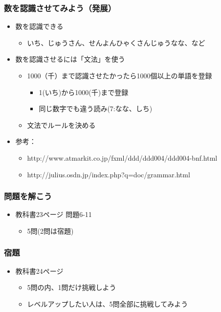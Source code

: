 \documentclass[14pt]{beamer}
\begin{document}
\begin{frame}
  \frametitle{数を認識させてみよう（発展）}
  \begin{itemize}
    \item 数を認識できる
    \begin{itemize}
      \item いち、じゅうさん、せんよんひゃくさんじゅうなな、など
    \end{itemize}
    \item 数を認識させるには「文法」を使う
    \begin{itemize}
      \item 1000（千）まで認識させたかったら1000個以上の単語を登録
      \begin{itemize}
        \item 1(いち)から1000(千)まで登録
        \item 同じ数字でも違う読み(7:なな、しち)
      \end{itemize}
      \item 文法でルールを決める
    \end{itemize}
    \item 参考：
    \begin{itemize}
      \item http://www.atmarkit.co.jp/fxml/ddd/ddd004/ddd004-bnf.html
      \item http://julius.osdn.jp/index.php?q=doc/grammar.html
    \end{itemize}
  \end{itemize}
\end{frame}

\begin{frame}
  \frametitle{問題を解こう}
  \begin{itemize}
    \item 教科書23ページ 問題6-11
    \begin{itemize}
      \item 5問(2問は宿題)
    \end{itemize}
  \end{itemize}
\end{frame}

\begin{frame}
  \frametitle{宿題}
  \begin{itemize}
    \item 教科書24ページ
    \begin{itemize}
      \item 5問の内、1問だけ挑戦しよう
      \item レベルアップしたい人は、5問全部に挑戦してみよう
    \end{itemize}
  \end{itemize}
\end{frame}
\end{document}
